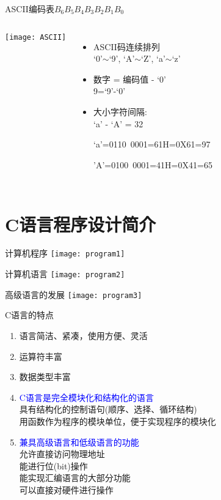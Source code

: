\begin{frame}{ASCII编码表$B_6B_5B_4B_3B_2B_1B_0$}
\begin{columns}
	\texttt{[image: ASCII]}
	\begin{itemize}
		\item ASCII码连续排列 \\
		 `0'$\sim$`9', `A'$\sim$`Z', `a'$\sim$`z'
		\item 数字 = 编码值 - `0' \\
		 9=`9'-`0'
		\item 大小字符间隔: \\
		`a' - `A' = 32
		
		\scriptsize{
		`a'=0110~0001=61H=0X61=97
		
		'A'=0100~0001=41H=0X41=65}
	\end{itemize}	
\end{columns}
\end{frame}

\section{C语言程序设计简介}

\begin{frame}{计算机程序}
\centering
\texttt{[image: program1]}
\end{frame}

\begin{frame}{计算机语言}
\centering
\texttt{[image: program2]}
\end{frame}

\begin{frame}{高级语言的发展}
\centering
\texttt{[image: program3]}
\end{frame}

\begin{frame}{C语言的特点}
\vspace{-0.5cm}
\begin{enumerate}
	\item 语言简洁、紧凑，使用方便、灵活
    \item 运算符丰富
    \item 数据类型丰富
    \item \textcolor{blue}{C语言是完全模块化和结构化的语言}\\
          具有结构化的控制语句(顺序、选择、循环结构)\\
          用函数作为程序的模块单位，便于实现程序的模块化
    \item \textcolor{blue}{兼具高级语言和低级语言的功能}\\
          允许直接访问物理地址\\
          能进行位(bit)操作\\  
          能实现汇编语言的大部分功能\\
          可以直接对硬件进行操作        
\end{enumerate}
\end{frame}

